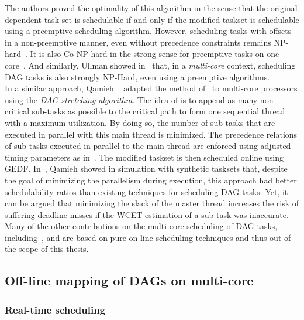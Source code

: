 \documentclass[main.tex]{subfiles}
\begin{document}
The authors proved the optimality of this algorithm in the sense that the
original dependent task set is schedulable if and only if the modified taskset
is schedulable using a preemptive scheduling algorithm. However, scheduling
tasks with offsets in a non-preemptive manner, even without precedence
constraints remains NP-hard~\cite{Lenstra1977}. It is also Co-NP hard in the
strong sense for preemptive tasks on one core~\cite{Leung1982}. And similarly,
Ullman showed in~\cite{Ullman1975} that, in a \emph{multi-core} context,
scheduling DAG tasks is also strongly NP-Hard, even using a preemptive
algorithms. \\ 

In a similar approach, Qamieh \etal~\cite{Qamhieh2013, Qamhieh2014} adapted the
method of~\cite{Chetto1990} to multi-core processors using the \emph{DAG
stretching algorithm}. The idea of is to append as many non-critical sub-tasks
as possible to the critical path to form one sequential thread with a maximum
utilization. By doing so, the number of sub-tasks that are executed in parallel
with this main thread is minimized. The precedence relations of sub-tasks
executed in parallel to the main thread are enforced using adjusted timing
parameters as in~\cite{Chetto1990}. The modified taskset is then scheduled
online using GEDF. In~\cite{Qamhieh2014}, Qamieh \etal showed in simulation
with synthetic tasksets that, despite the goal of minimizing the parallelism
during execution, this approach had better schedulability ratios than existing
techniques for scheduling DAG tasks. Yet, it can be argued that minimizing the
slack of the master thread increases the risk of suffering deadline misses if
the WCET estimation of a sub-task was inaccurate. \\

Many of the other contributions on the multi-core scheduling of DAG tasks,
including~\cite{Baruah2012_RTSS}, \cite{Li13} and \cite{Bonifaci2013} are based
on pure on-line scheduling techniques and thus out of the scope of this thesis.


\subsection{Off-line mapping of DAGs on multi-core}
\subsubsection{Real-time scheduling}
\end{document}
